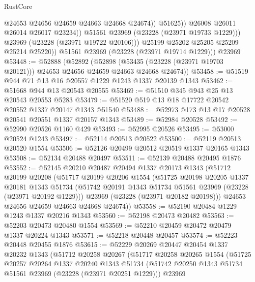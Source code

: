 \begin{lexlean}{RustCore}
\begin{coremodule}
                          @24653
                          @24656
                          @24659
                          @24663
                          @24668
                          @24674))
                      @51625))
                  @26008
                  @26011
                  @26014
                  @26017
                  @23234))
              @51561
              @23969
              (@23228 (@23971 @19733 @1229)))
            @23969
            (@23228 (@23971 @19722 @20106)))
          @25199
          @25202
          @25205
          @25209
          @25214
          @25220))
      @51561
      @23969
      (@23228 (@23971 @19714 @1229)))
    @23969
@53448 := @52888
    (@52892
      (@52898 (@53435 (@23228 (@23971 @19703 @20121))) @24653 @24656 @24659 @24663 @24668 @24674))
@53458 := @51519 @944 @71 @13 @16 @20557 @1229 @1243 @1337 @20139 @1343
@53462 := @51668 @944 @13 @20543 @20555
@53469 := @51510 @345 @943 @25 @13 @20543 @20553 @5283
@53479 := @51520 @519 @13 @18 @17722 @20542 @20552 @1337 @20147 @1343 @51540
@53488 := @52973 @173 @13 @17 @20528 @20541 @20551 @1337 @20157 @1343
@53489 := @52984 @20528
@53492 := @52990 @20526 @1160 @429
@53493 := @52995 @20526
@53495 := @53000 @20524 @1243
@53497 := @52114 @20513 @20522
@53500 := @52119 @20513 @20520 @1554
@53506 := @52126 @20499 @20512 @20519 @1337 @20165 @1343
@53508 := @52134 @20488 @20497
@53511 := @52139 @20488 @20495 @1876
@53552 := @52145
    @20210
    @20487
    @20494
    @1337
    @20173
    @1343
    (@51712
      @20199
      @20208
      (@51717
        @20199
        @20206
        @1554
        (@51725
          @20198
          @20205
          @1337
          @20181
          @1343
          @51734
          (@51742 @20191 @1343 @51734 @51561 @23969 (@23228 (@23971 @20192 @1229)))
          @23969
          (@23228 (@23971 @20182 @20198)))
        @24653
        @24656
        @24659
        @24663
        @24668
        @24674))
@53558 := @52190 @20484 @1229 @1243 @1337 @20216 @1343
@53560 := @52198 @20473 @20482
@53563 := @52203 @20473 @20480 @1554
@53569 := @52210 @20459 @20472 @20479 @1337 @20224 @1343
@53571 := @52218 @20448 @20457
@53574 := @52223 @20448 @20455 @1876
@53615 := @52229
    @20269
    @20447
    @20454
    @1337
    @20232
    @1343
    (@51712
      @20258
      @20267
      (@51717
        @20258
        @20265
        @1554
        (@51725
          @20257
          @20264
          @1337
          @20240
          @1343
          @51734
          (@51742 @20250 @1343 @51734 @51561 @23969 (@23228 (@23971 @20251 @1229)))
          @23969

\end{coremodule}
\end{lexlean}
